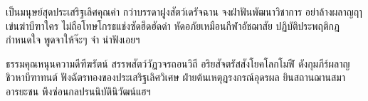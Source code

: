 \documentclass{article}
\begin{document}
เป็นมนุษย์สุดประเสริฐเลิศคุณค่า กว่าบรรดาฝูงสัตว์เดรัจฉาน
จงฝ่าฟันพัฒนาวิชาการ อย่าล้างผลาญฤๅเข่นฆ่าบีฑาใคร
ไม่ถือโทษโกรธแช่งซัดฮึดฮัดด่า หัดอภัยเหมือนกีฬาอัชฌาสัย
ปฏิบัติประพฤติกฎกำหนดใจ พูดจาให้จ๊ะๆ จ๋า น่าฟังเอยฯ

ธรรมคุณหนุนความดีฑีฆรัตน์ สรรพสัตว์วัฏวจรถอนวิถี
อริยสัจตรัสสังโยคโลกโมฬี ดังกุมภีร์ผลาญชิวหาบีฑาทนต์
ฟังฉัตรทองของประเสริฐเลิศวิเศษ ฝ่ายต้นเหตุฎรงกรณ์อุดรผล
ยินสถานฌานสมาอารยะชน พึงซ่อนกลปรนนิบัตินิวัฒน์แฮฯ
\end{document}
